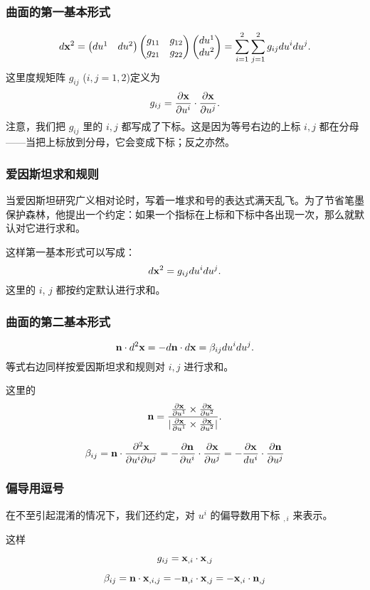 \documentclass[CJK,13pt]{beamer}
\begin{document}
\begin{frame}
  \frametitle{曲面的第一基本形式}
  $$ d{\mathbf{x}}^2  =
  \begin{pmatrix}
    du^1 &    du^2
  \end{pmatrix}
  \begin{pmatrix}
    g_{11} &   g_{12} \\
    g_{21} & g_{22}
  \end{pmatrix}
  \begin{pmatrix}
    du^1 \\
    du^2
  \end{pmatrix}  
  =  \sum_{i=1}^2\sum_{j=1}^2 g_{ij}du^i du^j.$$
  这里度规矩阵 $g_{ij}$ ($i,j=1,2$)定义为
  $$g_{ij} = \frac{\partial{\mathbf{x}}}{\partial u^i}\cdot\frac{\partial{\mathbf{x}}}{\partial u^j}.$$
  注意，我们把 $g_{ij}$ 里的 $i, j$ 都写成了下标。这是因为等号右边的上标 $i, j$ 都在分母——当把上标放到分母，它会变成下标；反之亦然。
\end{frame}

\begin{frame}
  \frametitle{爱因斯坦求和规则}
  当爱因斯坦研究广义相对论时，写着一堆求和号的表达式满天乱飞。为了节省笔墨保护森林，他提出一个约定：{\blue 如果一个指标在上标和下标中各出现一次，那么就默认对它进行求和。}

  
  这样第一基本形式可以写成：
  $$ d{\mathbf{x}}^2 = g_{ij}du^i du^j.$$
  这里的 $i$, $j$ 都按约定默认进行求和。
\end{frame}


\begin{frame}
  \frametitle{曲面的第二基本形式}
  $${\mathbf{n}}\cdot d^2{\mathbf{x}} = - d{\mathbf{n}}\cdot d{\mathbf{x}} = \beta_{ij}du^i du^j.$$
  等式右边同样按爱因斯坦求和规则对 $i, j$ 进行求和。

  这里的
  $$ {\mathbf{n}} = \frac{\frac{\partial{\mathbf{x}}}{\partial u^1}\times \frac{\partial{\mathbf{x}}}{\partial u^2}}{\lvert\frac{\partial{\mathbf{x}}}{\partial u^1}\times \frac{\partial{\mathbf{x}}}{\partial u^2}\rvert}. $$
  
  $$ \beta_{ij} = {\mathbf{n}} \cdot \frac{\partial^2{\mathbf{x}}}{\partial u^i \partial u^j} = - \frac{\partial {\mathbf{n}}}{\partial u^i} \cdot \frac{\partial {\mathbf{x}}}{\partial u^j} = - \frac{\partial {\mathbf{x}}}{du^i} \cdot \frac{\partial {\mathbf{n}}}{\partial u^j}$$
\end{frame}

\begin{frame}
  \frametitle{偏导用逗号}
  在不至引起混淆的情况下，我们还约定，对 $u^i$ 的偏导数用下标 $_{, i}$ 来表示。

  \skipline
  
  这样

  $$g_{ij} = {\mathbf{x}}_{, i} \cdot {\mathbf{x}}_{,j}$$

  $$\beta_{ij} = {\mathbf{n}} \cdot {\mathbf{x}}_{, i, j} = - {\mathbf{n}}_{, i} \cdot {\mathbf{x}}_{, j} = - {\mathbf{x}}_{, i}\cdot {\mathbf{n}}_{, j} $$  
 
\end{frame}
\end{document}
